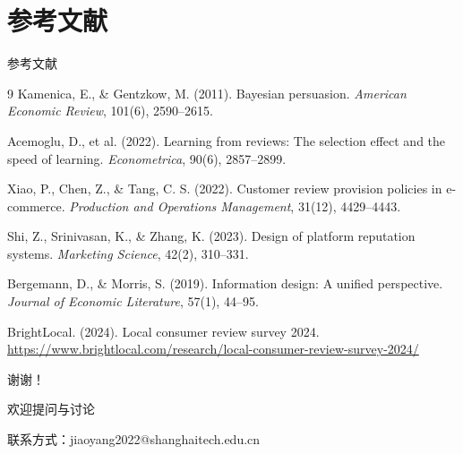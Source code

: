 \documentclass[aspectratio=169,10pt]{beamer}
\begin{document}
\section*{参考文献}

\begin{frame}{参考文献}
\small
\begin{thebibliography}{9}
 Kamenica, E., \& Gentzkow, M. (2011). Bayesian persuasion. \textit{American Economic Review}, 101(6), 2590--2615.

 Acemoglu, D., et al. (2022). Learning from reviews: The selection effect and the speed of learning. \textit{Econometrica}, 90(6), 2857--2899.

 Xiao, P., Chen, Z., \& Tang, C. S. (2022). Customer review provision policies in e-commerce. \textit{Production and Operations Management}, 31(12), 4429--4443.

 Shi, Z., Srinivasan, K., \& Zhang, K. (2023). Design of platform reputation systems. \textit{Marketing Science}, 42(2), 310--331.

 Bergemann, D., \& Morris, S. (2019). Information design: A unified perspective. \textit{Journal of Economic Literature}, 57(1), 44--95.

 BrightLocal. (2024). Local consumer review survey 2024. \url{https://www.brightlocal.com/research/local-consumer-review-survey-2024/}
\end{thebibliography}
\end{frame}


\begin{frame}
\begin{center}
\vspace{1.5cm}
{\Huge 谢谢！}

\vspace{0.8cm}
{\large 欢迎提问与讨论}

\vspace{1.2cm}
{\small 联系方式：jiaoyang2022@shanghaitech.edu.cn}
\end{center}
\end{frame}
\end{document}
